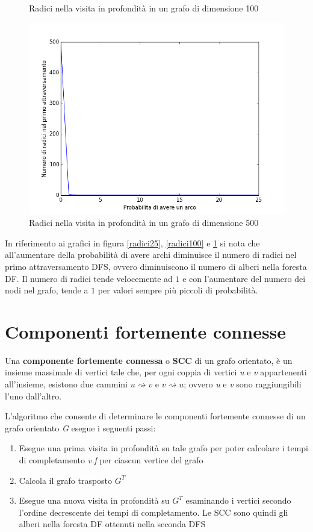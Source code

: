\documentclass[11pt]{article}
\begin{document}
\begin{figure}[p]
\centering
\caption{Radici nella visita in profondità in un grafo di dimensione 100}
\label{radici100}
\includegraphics[scale=0.33,angle=0]{radici500.png}
\centering
\caption{Radici nella visita in profondità in un grafo di dimensione 500}
\label{radici500}
\end{figure}
\newline
In riferimento ai grafici in figura \ref{radici25}, \ref{radici100} e \ref{radici500} si nota che all'aumentare della probabilità di avere archi diminuisce il numero di radici nel primo attraversamento DFS, ovvero diminuiscono il numero di alberi nella foresta DF. Il numero di radici tende velocemente ad $1$ e con l'aumentare del numero dei nodi nel grafo, tende a $1$ per valori sempre più piccoli di probabilità.
\section{Componenti fortemente connesse}
Una \textbf{componente fortemente connessa} o \textbf{SCC} di un grafo orientato, è un insieme massimale di vertici tale che, per ogni coppia di vertici \textit{u} e \textit{v} appartenenti all'insieme, esistono due cammini $u \rightsquigarrow v$ e $v \rightsquigarrow u$; ovvero \textit{u} e \textit{v} sono raggiungibili l'uno dall'altro.

L'algoritmo che consente di determinare le componenti fortemente connesse di un grafo orientato \textit{G} esegue i seguenti passi:
\begin{enumerate}
\item Esegue una prima visita in profondità su tale grafo per poter calcolare i tempi di completamento \textit{v.f} per ciascun vertice del grafo
\item Calcola il grafo trasposto $G^T$
\item Esegue una nuova visita in profondità su $G^T$ esaminando i vertici secondo l'ordine decrescente dei tempi di completamento. Le SCC sono quindi gli alberi nella foresta DF ottenuti nella seconda DFS
\end{enumerate}
\end{document}

